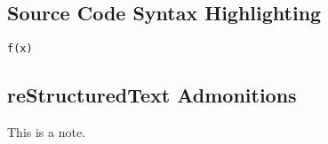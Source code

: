 \documentclass{article}
\begin{document}

\subsection{Source Code Syntax Highlighting}

\begin{alltt}
\pysrcprompt{{\textgreater}{\textgreater}{\textgreater} }f(x)
\end{alltt}

\subsection{reStructuredText Admonitions}

\newlength{\admonitionwidth}
\setlength{\admonitionwidth}{.8\textwidth}

\begin{reSTadmonition}[note]
  This is a note.
\end{reSTadmonition}


\end{document}

